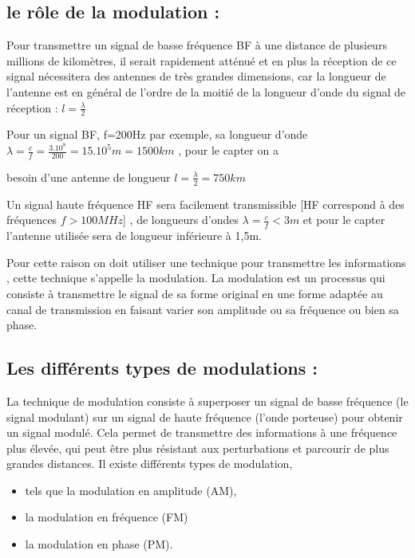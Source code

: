 \documentclass[12pt]{article}
\begin{document}
\subsection{le rôle de la modulation :  }
Pour transmettre un signal de basse fréquence BF à une distance de plusieurs millions de kilomètres, il serait rapidement
atténué et en plus la réception de ce signal nécessitera des antennes de très grandes dimensions, car la longueur de l'antenne est en général de l'ordre de la moitié de la longueur d'onde du signal de réception : $l = \frac{\lambda}{2}$

Pour un signal BF, f=200Hz par exemple, sa longueur d'onde $\lambda = \frac{c}{f} = \frac{3.10^8}{200} = 15.10^5m = 1500km$ , pour le capter on a

besoin d'une antenne de longueur $l = \frac{\lambda}{2} = 750km$

Un signal haute fréquence HF sera facilement transmissible [HF correspond à des fréquences $f> 100MHz$] , de longueurs d'ondes $\lambda = \frac{c}{f}<3m$ et pour le capter l’antenne utilisée sera de longueur inférieure à 1,5m.

Pour cette raison on doit utiliser une technique pour transmettre les informations , cette technique s'appelle la modulation.
La modulation est un processus qui consiste à transmettre le signal de sa forme original en une forme adaptée au canal de
transmission en faisant varier son amplitude ou sa fréquence ou bien sa phase.

\subsection{Les différents types de modulations : }


La technique de modulation consiste à superposer un signal de basse fréquence (le signal modulant) sur un signal de haute fréquence (l'onde porteuse) pour obtenir un signal modulé. Cela permet de transmettre des informations à une fréquence plus élevée, qui peut être plus résistant aux perturbations et parcourir de plus grandes distances. Il existe différents types de modulation, 

\begin{itemize}
	\item tels que la modulation en amplitude (AM), \item la modulation en fréquence (FM) \item  la modulation en phase (PM).
\end{itemize}
\end{document}
